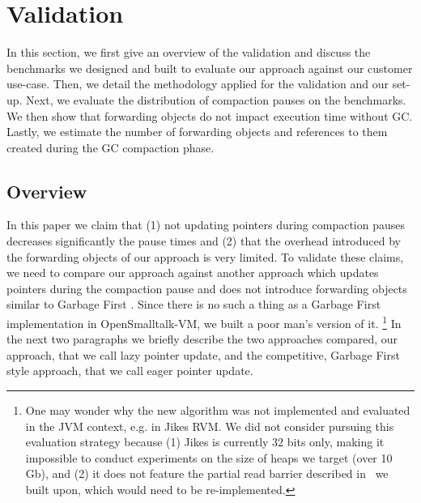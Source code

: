 \documentclass[sigplan,10pt,review,anonymous]{acmart}\settopmatter{printfolios=true,printccs=false,printacmref=false}
\newcommand{\egb}[1]{\color{blue}\fbox{\bfseries\sffamily\scriptsize Elisa:}{\sf\small$\blacktriangleright$\textit{#1}$\blacktriangleleft$}\color{black}}
\def\OpenSmalltalkVM{OpenSmalltalk-VM\xspace}
\begin{document}
\section{Validation}
\label{sec:validation}

In this section, we first give an overview of the validation and discuss the benchmarks we designed and built to evaluate our approach against our customer use-case. Then, we detail the methodology applied for the validation and our set-up. Next, we evaluate the distribution of compaction pauses on the benchmarks. We then show that forwarding objects do not impact execution time without GC. Lastly, we estimate the number of forwarding objects and references to them created during the GC compaction phase.

\subsection{Overview}
\label{sec:ow}

In this paper we claim that (1) not updating pointers during compaction pauses decreases significantly the pause times and (2) that the overhead introduced by the forwarding objects of our approach is very limited. To validate these claims, we need to compare our approach against another approach which updates pointers during the compaction pause and does not introduce forwarding objects similar to Garbage First \cite{G1}. 
Since there is no such a thing as a Garbage First implementation in \OpenSmalltalkVM, we built a poor man's version of it. 
\footnote{One may wonder why the new algorithm was not implemented and evaluated in the JVM context, e.g. in Jikes RVM. We did not consider pursuing this evaluation strategy because (1) Jikes is currently 32 bits only, making it impossible to conduct experiments on the size of heaps we target (over 10 Gb), 
and (2) it does not feature the partial read barrier described in~\cite{Forwarders} we built upon, which would need to be re-implemented.}
In the next two paragraphs we briefly describe the two approaches compared, our approach, that we call lazy pointer update, and the competitive, Garbage First style approach, that we call eager pointer update.
\end{document}
